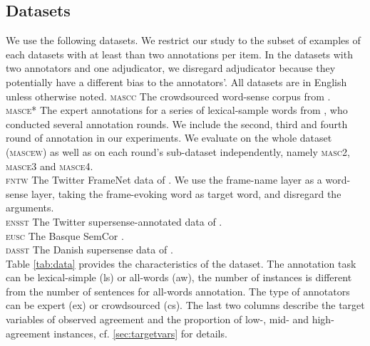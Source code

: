 \documentclass[11pt,a4paper]{article}
\begin{document}
\subsection{Datasets}
We use the following datasets. We restrict our study to the subset of examples of each datasets with at least than two annotations per item. In the datasets with two annotators and one adjudicator, we disregard adjudicator because they potentially have a different bias to the annotators'. All datasets are in English unless otherwise noted.
\noindent\textsc{mascc} The crowdsourced word-sense corpus from \cite{Passenau2010}.\\
\textsc{masce*} The expert annotations for a series of lexical-sample words from \cite{Passonneau2012}, who conducted several annotation rounds. We include the second, third and fourth round of annotation in our experiments. We evaluate on the whole dataset (\textsc{mascew}) as well as on each round's sub-dataset independently, namely \textsc{masc2}, \textsc{masce3} and \textsc{masce4}.\\
\textsc{fntw} The Twitter FrameNet data of \cite{Sogaard2015}. We use the frame-name layer as a word-sense layer, taking the frame-evoking word as target word, and disregard the arguments.\\
\textsc{ensst} The Twitter supersense-annotated data of .\\
\textsc{eusc} The Basque SemCor \cite{Agirre2006}.\\
\textsc{dasst} The Danish supersense data of \cite{MartinezAlonso2015}.\\
Table \ref{tab:data} provides the characteristics of the dataset. The annotation task can be lexical-simple (ls) or all-words (aw), the number of instances is different from the number of sentences for all-words annotation. The type of annotators can be expert (ex) or crowdsourced (cs). The last two columns describe the target variables of observed agreement and the proportion of low-, mid- and high-agreement instances, cf. \ref{sec:targetvars} for details.
\end{document}
